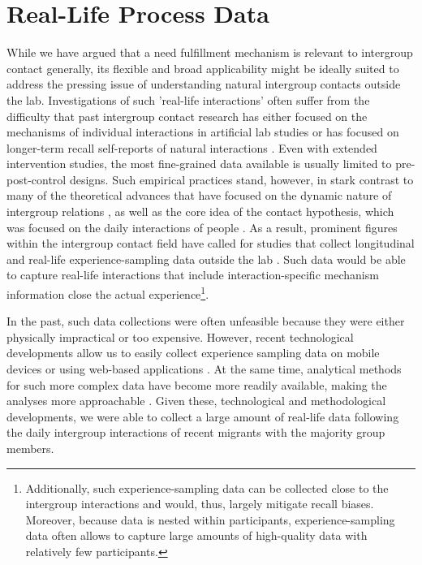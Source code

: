 \documentclass[man, 12pt, a4paper]{apa7}
\theoremstyle{break}
\theoremstyle{plain}
\begin{document}
\section{Real-Life Process Data}
While we have argued that a need fulfillment mechanism is relevant to intergroup contact generally, its flexible and broad applicability might be ideally suited to address the pressing issue of understanding natural intergroup contacts outside the lab. Investigations of such 'real-life interactions' often suffer from the difficulty that past intergroup contact research has either focused on the mechanisms of individual interactions in artificial lab studies or has focused on longer-term recall self-reports of natural interactions \citep[e.g.,][]{Pettigrew2006}. Even with extended intervention studies, the most fine-grained data available is usually limited to pre-post-control designs. Such empirical practices stand, however, in stark contrast to many of the theoretical advances that have focused on the dynamic nature of intergroup relations \citep[e.g.,][]{Pettigrew1998}, as well as the core idea of the contact hypothesis, which was focused on the daily interactions of people \citep[see][]{Allport1954b}. As a result, prominent figures within the intergroup contact field have called for studies that collect longitudinal \citep[][]{Pettigrew1998, Pettigrew2008, Pettigrew2008b, Pettigrew2011} and real-life experience-sampling data outside the lab \citep[][]{MacInnis2015, McKeown2017, Dixon2005}. Such data would be able to capture real-life interactions that include interaction-specific mechanism information close the actual experience\footnote{Additionally, such experience-sampling data can be collected close to the intergroup interactions and would, thus, largely mitigate recall biases. Moreover, because data is nested within participants, experience-sampling data often allows to capture large amounts of high-quality data with relatively few participants.}.

In the past, such data collections were often unfeasible because they were either physically impractical or too expensive. However, recent technological developments allow us to easily collect experience sampling data on mobile devices \citep[e.g.,][]{Keil2020} or using web-based applications \citep[e.g.,][]{Arslan2020}. At the same time, analytical methods for such more complex data have become more readily available, making the analyses more approachable \citep[see, e.g.,][]{ODonnell2021}. Given these, technological and methodological developments, we were able to collect a large amount of real-life data following the daily intergroup interactions of recent migrants with the majority group members.  
\end{document}
